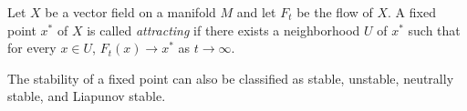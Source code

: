 \documentclass[12pt]{article}
\begin{document}
Let $X$ be a vector field on a manifold $M$ and let $F_t$ be the flow of $X$. A fixed point $x^*$ of $X$ is called {\em attracting} if there exists a neighborhood $U$ of $x^*$ such that for every $x\in U$, $F_{t}(x)\to x^*$ as $t\to\infty$.

The stability of a fixed point can also be classified as stable, unstable, neutrally stable, and Liapunov stable.
\end{document}
